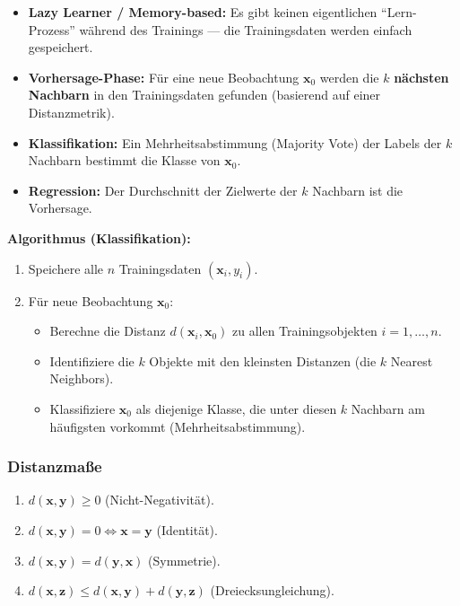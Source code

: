 \begin{itemize}[leftmargin=1.5em]
    \item \textbf{Lazy Learner / Memory-based:} Es gibt keinen eigentlichen ``Lern-Prozess'' während des Trainings — die Trainingsdaten werden einfach gespeichert.
    \item \textbf{Vorhersage-Phase:} Für eine neue Beobachtung $\mathbf{x}_0$ werden die $k$ \textbf{nächsten Nachbarn} in den Trainingsdaten gefunden (basierend auf einer Distanzmetrik).
    \item \textbf{Klassifikation:} Ein Mehrheitsabstimmung (Majority Vote) der Labels der $k$ Nachbarn bestimmt die Klasse von $\mathbf{x}_0$.
    \item \textbf{Regression:} Der Durchschnitt der Zielwerte der $k$ Nachbarn ist die Vorhersage.
\end{itemize}

\textbf{Algorithmus (Klassifikation):}
\begin{enumerate}[leftmargin=1.5em]
    \item Speichere alle $n$ Trainingsdaten $(\mathbf{x}_i, y_i)$.
    \item Für neue Beobachtung $\mathbf{x}_0$:
    \begin{itemize}
        \item Berechne die Distanz $d(\mathbf{x}_i, \mathbf{x}_0)$ zu allen Trainingsobjekten $i = 1, \ldots, n$.
        \item Identifiziere die $k$ Objekte mit den kleinsten Distanzen (die $k$ Nearest Neighbors).
        \item Klassifiziere $\mathbf{x}_0$ als diejenige Klasse, die unter diesen $k$ Nachbarn am häufigsten vorkommt (Mehrheitsabstimmung).
    \end{itemize}
\end{enumerate}

\subsubsection{Distanzmaße}

\definition{\textbf{Distanzfunktion:} Eine Funktion $d: \mathbb{R}^p \times \mathbb{R}^p \to [0, \infty)$ muss vier Bedingungen erfüllen (Metrik):}
\begin{enumerate}[leftmargin=1.5em]
    \item $d(\mathbf{x}, \mathbf{y}) \geq 0$ (Nicht-Negativität).
    \item $d(\mathbf{x}, \mathbf{y}) = 0 \Leftrightarrow \mathbf{x} = \mathbf{y}$ (Identität).
    \item $d(\mathbf{x}, \mathbf{y}) = d(\mathbf{y}, \mathbf{x})$ (Symmetrie).
    \item $d(\mathbf{x}, \mathbf{z}) \leq d(\mathbf{x}, \mathbf{y}) + d(\mathbf{y}, \mathbf{z})$ (Dreiecksungleichung).
\end{enumerate}

